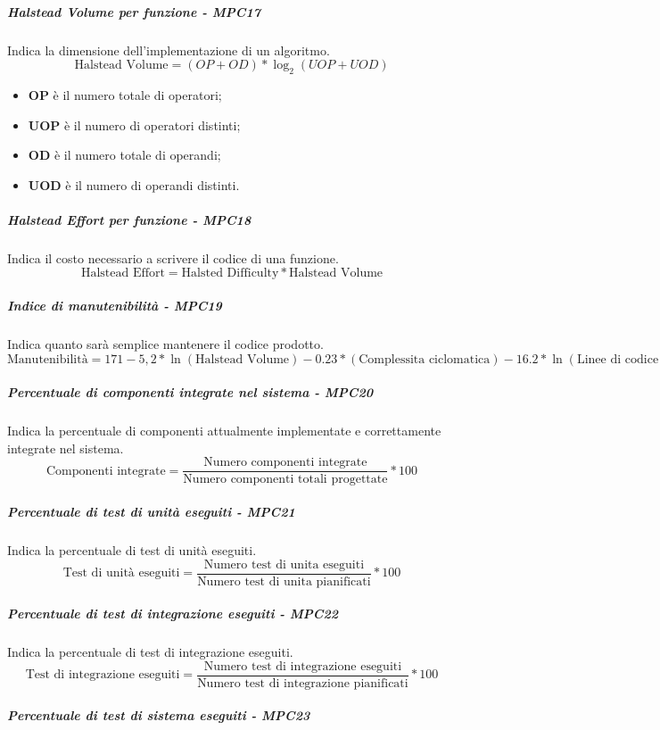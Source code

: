 \subparagraph{Halstead Volume per funzione - MPC17}
Indica la dimensione dell'implementazione di un algoritmo.
\begin{equation*}
\text{Halstead Volume} = (OP + OD) * \log_2(UOP + UOD)
\end{equation*}	
\begin{itemize}
	\item \textbf{OP} è il numero totale di operatori;
	\item \textbf{UOP} è il numero di operatori distinti;
	\item \textbf{OD} è il numero totale di operandi;
	\item \textbf{UOD} è il numero di operandi distinti.
\end{itemize}
\subparagraph{Halstead Effort per funzione - MPC18}
Indica il costo necessario a scrivere il codice di una funzione.
\begin{equation*}
\text{Halstead Effort} = \text{Halsted Difficulty} * \text{Halstead Volume}
\end{equation*}	
\subparagraph{Indice di manutenibilità - MPC19}
Indica quanto sarà semplice mantenere il codice prodotto.
\begin{equation*}
\text{Manutenibilità} = 171 - 5,2 * \ln(\text{Halstead Volume}) - 0.23 * (\text{Complessita ciclomatica}) - 16.2 * \ln(\text{Linee di codice})
\end{equation*}
\subparagraph{Percentuale di componenti integrate nel sistema - MPC20}
Indica la percentuale di componenti attualmente implementate e correttamente integrate nel sistema.
\begin{equation*}
\text{Componenti integrate} = \frac{\text{Numero componenti integrate}}{\text{Numero componenti totali progettate}} * 100
\end{equation*}
\subparagraph{Percentuale di test di unità eseguiti - MPC21}
Indica la percentuale di test di unità eseguiti.
\begin{equation*}
\text{Test di unità eseguiti} = \frac{\text{Numero test di unita eseguiti}}{\text{Numero test di unita pianificati}} * 100
\end{equation*}
\subparagraph{Percentuale di test di integrazione eseguiti - MPC22}
Indica la percentuale di test di integrazione eseguiti.
\begin{equation*}
\text{Test di integrazione eseguiti} = \frac{\text{Numero test di integrazione eseguiti}}{\text{Numero test di integrazione pianificati}} * 100
\end{equation*}
\subparagraph{Percentuale di test di sistema eseguiti - MPC23}
